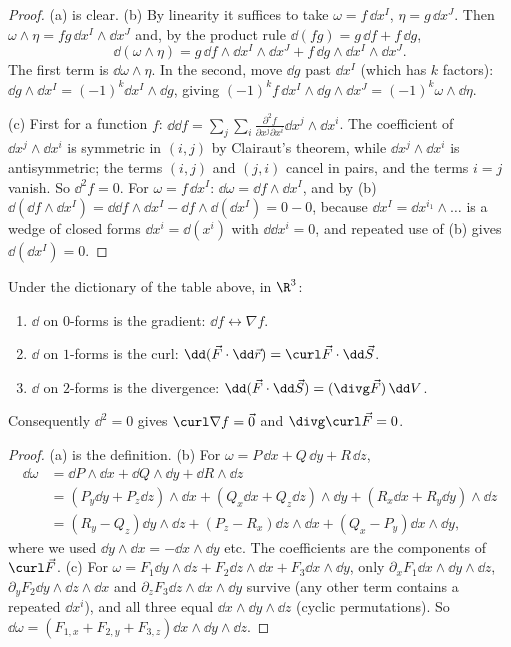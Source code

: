 \begin{proof}
(a) is clear. (b) By linearity it suffices to take $\omega=f\,\dd x^I$, $\eta=g\,\dd x^J$. Then $\omega\wedge\eta=fg\,\dd x^I\wedge\dd x^J$ and, by the product rule $\dd(fg)=g\,\dd f+f\,\dd g$,
\[
\dd(\omega\wedge\eta)=g\,\dd f\wedge\dd x^I\wedge\dd x^J+f\,\dd g\wedge\dd x^I\wedge\dd x^J .
\]
The first term is $\dd\omega\wedge\eta$. In the second, move $\dd g$ past $\dd x^I$ (which has $k$ factors): $\dd g\wedge\dd x^I=(-1)^k\dd x^I\wedge\dd g$, giving $(-1)^kf\,\dd x^I\wedge\dd g\wedge\dd x^J=(-1)^k\omega\wedge\dd\eta$.

(c) First for a function $f$: $\dd\dd f=\sum_j\sum_i\frac{\partial^2f}{\partial x^j\partial x^i}\dd x^j\wedge\dd x^i$. The coefficient of $\dd x^j\wedge\dd x^i$ is symmetric in $(i,j)$ by Clairaut's theorem, while $\dd x^j\wedge\dd x^i$ is antisymmetric; the terms $(i,j)$ and $(j,i)$ cancel in pairs, and the terms $i=j$ vanish. So $\dd^2f=0$. For $\omega=f\,\dd x^I$: $\dd\omega=\dd f\wedge\dd x^I$, and by (b) $\dd(\dd f\wedge\dd x^I)=\dd\dd f\wedge\dd x^I-\dd f\wedge\dd(\dd x^I)=0-0$, because $\dd x^I=\dd x^{i_1}\wedge\dots$ is a wedge of closed forms $\dd x^{i}=\dd(x^i)$ with $\dd\dd x^i=0$, and repeated use of (b) gives $\dd(\dd x^I)=0$.
\end{proof}

\begin{theorem}\label{thm:ddict}
Under the dictionary of the table above, in $\R^3$:
\begin{enumerate}[label=(\alph*)]
  \item $\dd$ on $0$-forms is the gradient: $\dd f\leftrightarrow\nabla f$.
  \item $\dd$ on $1$-forms is the curl: $\dd(\vec F\cdot\dd\vec r)=\curl\vec F\cdot\dd\vec S$.
  \item $\dd$ on $2$-forms is the divergence: $\dd(\vec F\cdot\dd\vec S)=(\divg\vec F)\,\dd V$.
\end{enumerate}
Consequently $\dd^2=0$ gives $\curl\nabla f=\vec0$ and $\divg\curl\vec F=0$.
\end{theorem}

\begin{proof}
(a) is the definition. (b) For $\omega=P\,\dd x+Q\,\dd y+R\,\dd z$,
\begin{align*}
\dd\omega&=\dd P\wedge\dd x+\dd Q\wedge\dd y+\dd R\wedge\dd z\\
&=(P_y\dd y+P_z\dd z)\wedge\dd x+(Q_x\dd x+Q_z\dd z)\wedge\dd y+(R_x\dd x+R_y\dd y)\wedge\dd z\\
&=(R_y-Q_z)\dd y\wedge\dd z+(P_z-R_x)\dd z\wedge\dd x+(Q_x-P_y)\dd x\wedge\dd y,
\end{align*}
where we used $\dd y\wedge\dd x=-\dd x\wedge\dd y$ etc. The coefficients are the components of $\curl\vec F$. (c) For $\omega=F_1\dd y\wedge\dd z+F_2\dd z\wedge\dd x+F_3\dd x\wedge\dd y$, only $\partial_xF_1\dd x\wedge\dd y\wedge\dd z$, $\partial_yF_2\dd y\wedge\dd z\wedge\dd x$ and $\partial_zF_3\dd z\wedge\dd x\wedge\dd y$ survive (any other term contains a repeated $\dd x^i$), and all three equal $\dd x\wedge\dd y\wedge\dd z$ (cyclic permutations). So $\dd\omega=(F_{1,x}+F_{2,y}+F_{3,z})\dd x\wedge\dd y\wedge\dd z$.
\end{proof}

